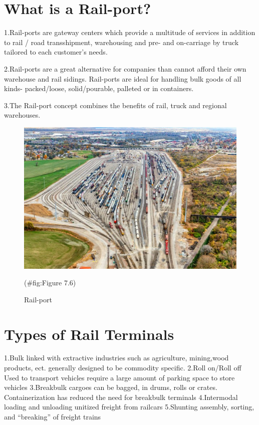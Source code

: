 \documentclass[
]{book}
\begin{document}
\hypertarget{SupplyChain-whatisRailport}{%
\section{What is a Rail-port?}\label{SupplyChain-whatisRailport}}

1.Rail-ports are gateway centers which provide a multitude of services in addition to rail / road transshipment, warehousing and pre- and on-carriage by truck tailored to each customer's needs.

2.Rail-ports are a great alternative for companies than cannot afford their own warehouse and rail sidings. Rail-ports are ideal for handling bulk goods of all kinds- packed/loose, solid/pourable, palleted or in containers.

3.The Rail-port concept combines the benefits of rail, truck and regional warehouses.

\begin{figure}

{\centering \includegraphics{./Images/supplychain/Rail-port} 

}

\caption{Rail-port}(\#fig:Figure 7.6)
\end{figure}

\hypertarget{SupplyChain-Railporttypes}{%
\section{Types of Rail Terminals}\label{SupplyChain-Railporttypes}}

1.Bulk
linked with extractive industries such as agriculture, mining,wood products, ect.
generally designed to be commodity specific.
2.Roll on/Roll off
Used to transport vehicles
require a large amount of parking space to store vehicles
3.Breakbulk
cargoes can be bagged, in drums, rolls or crates.
Containerization has reduced the need for breakbulk terminals
4.Intermodal
loading and unloading unitized freight from railcars
5.Shunting
assembly, sorting, and ``breaking'' of freight trains
\end{document}
